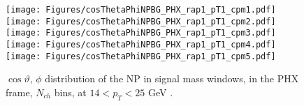 \documentclass[12pt]{article}
\newcommand{\pt}{$p_{\mathrm{T}}$}
\begin{document}
%
%


\begin{figure}[htbp]
\centering
\texttt{[image: Figures/cosThetaPhiNPBG\_PHX\_rap1\_pT1\_cpm1.pdf]}
\texttt{[image: Figures/cosThetaPhiNPBG\_PHX\_rap1\_pT1\_cpm2.pdf]}
\texttt{[image: Figures/cosThetaPhiNPBG\_PHX\_rap1\_pT1\_cpm3.pdf]}
\texttt{[image: Figures/cosThetaPhiNPBG\_PHX\_rap1\_pT1\_cpm4.pdf]}
\texttt{[image: Figures/cosThetaPhiNPBG\_PHX\_rap1\_pT1\_cpm5.pdf]}
\caption{$\cos\vartheta,\,\phi$ distribution of the NP in signal mass windows, 
	in the PHX frame, $N_{ch}$ bins, at $14 < p_{T} < 25$ GeV .}
\end{figure}
\clearpage
\end{document}
